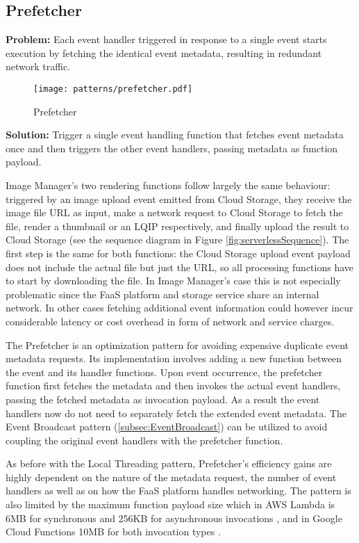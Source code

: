 \subsection{Prefetcher} \label{subsec:prefetcher}

\textbf{Problem:} Each event handler triggered in response to a single event starts execution by fetching the identical event metadata, resulting in redundant network traffic.

\begin{figure}[h]
  \centering
  \texttt{[image: patterns/prefetcher.pdf]}
  \caption{Prefetcher}
  \label{fig:prefetcher}
\end{figure}

\textbf{Solution:} Trigger a single event handling function that fetches event metadata once and then triggers the other event handlers, passing metadata as function payload.

Image Manager's two rendering functions follow largely the same behaviour: triggered by an image upload event emitted from Cloud Storage, they receive the image file URL as input, make a network request to Cloud Storage to fetch the file, render a thumbnail or an LQIP respectively, and finally upload the result to Cloud Storage (see the sequence diagram in Figure \ref{fig:serverlessSequence}). The first step is the same for both functions: the Cloud Storage upload event payload does not include the actual file but just the URL, so all processing functions have to start by downloading the file. In Image Manager's case this is not especially problematic since the FaaS platform and storage service share an internal network. In other cases fetching additional event information could however incur considerable latency or cost overhead in form of network and service charges.

The Prefetcher is an optimization pattern for avoiding expensive duplicate event metadata requests. Its implementation involves adding a new function between the event and its handler functions. Upon event occurrence, the prefetcher function first fetches the metadata and then invokes the actual event handlers, passing the fetched metadata as invocation payload. As a result the event handlers now do not need to separately fetch the extended event metadata. The Event Broadcast pattern (\ref{subsec:EventBroadcast}) can be utilized to avoid coupling the original event handlers with the prefetcher function.

As before with the Local Threading pattern, Prefetcher's efficiency gains are highly dependent on the nature of the metadata request, the number of event handlers as well as on how the FaaS platform handles networking. The pattern is also limited by the maximum function payload size which in AWS Lambda is 6MB for synchronous and 256KB for asynchronous invocations \parencite{awslambda0218}, and in Google Cloud Functions 10MB for both invocation types \parencite{google18cloudFunctions}.

